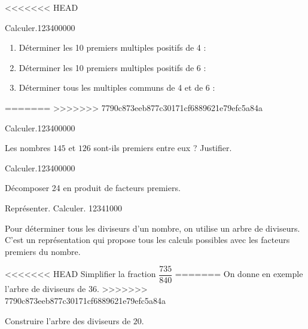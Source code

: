 \begin{pageAD} 


<<<<<<< HEAD
\begin{ExoCad}{Calculer.}{1234}{0}{0}{0}{0}{0}
\begin{enumerate}
\item Déterminer les 10 premiers multiples positifs de 4 : 
\item Déterminer les 10 premiers multiples positifs de 6 : 
\item Déterminer tous les multiples communs de 4 et de 6 : 
\end{enumerate}
\end{ExoCad}
=======
>>>>>>> 7790c873eeb877c30171cf6889621e79efc5a84a


\begin{ExoCad}{Calculer.}{1234}{0}{0}{0}{0}{0}

Les nombres $145$ et $126$ sont-ils premiers entre eux ? Justifier.


\end{ExoCad}





\begin{ExoCad}{Calculer.}{1234}{0}{0}{0}{0}{0}

Décomposer 24 en produit de facteurs premiers.


\end{ExoCad}

\begin{ExoCad}{Représenter. Calculer. }{1234}{1}{0}{0}{0}

\begin{minipage}{0.55\linewidth}

Pour déterminer tous les diviseurs d'un nombre, on utilise un arbre de diviseurs. C'est un représentation qui propose tous les calculs possibles avec les facteurs premiers du nombre.

<<<<<<< HEAD
Simplifier la fraction $\dfrac{735}{840}$ 
=======
On donne en exemple l'arbre de diviseurs de $36$.
>>>>>>> 7790c873eeb877c30171cf6889621e79efc5a84a

Construire l'arbre des diviseurs de $20$.

\vspace{4cm}

\end{minipage}
\begin{minipage}{0.4\linewidth}


\end{minipage}
\end{ExoCad}
\end{pageAD}

